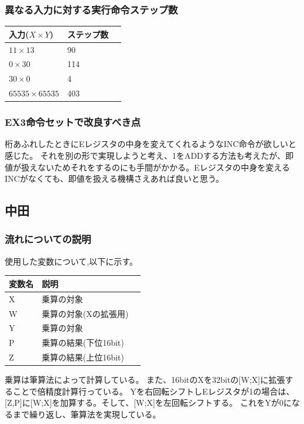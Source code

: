 \documentclass[dvipdfmx,12pt]{jreport}
\begin{document}
\subsubsection{異なる入力に対する実行命令ステップ数}
\begin{table}[h]
  \begin{tabular}{|l|l|l|} \hline
    入力($X \times Y$) & ステップ数 \\ \hline
    $11 \times 13$ & 90 \\ \hline
    $0 \times 30$ & 114 \\ \hline
    $30 \times 0$ & 4 \\ \hline
    $65535 \times 65535$ & 403 \\ \hline
  \end{tabular}
\end{table}

\subsubsection{EX3命令セットで改良すべき点}
桁あふれしたときにEレジスタの中身を変えてくれるようなINC命令が欲しいと感じた。
それを別の形で実現しようと考え、1をADDする方法も考えたが、即値が扱えないためそれをするのにも手間がかかる。Eレジスタの中身を変えるINCがなくても、即値を扱える機構さえあれば良いと思う。

\subsection*{中田}
\subsubsection*{流れについての説明}
使用した変数について,以下に示す。
\begin{table}[h]
  \begin{tabular}{|l|l|l|} \hline
    変数名 & 説明 \\ \hline
    X & 乗算の対象 \\ \hline
    W & 乗算の対象(Xの拡張用) \\ \hline
    Y& 乗算の対象 \\ \hline
    P & 乗算の結果(下位16bit) \\ \hline
    Z & 乗算の結果(上位16bit) \\ \hline
  \end{tabular}
\end{table}

乗算は筆算法によって計算している。
また、16bitのXを32bitの[W;X]に拡張することで倍精度計算行っている。
Yを右回転シフトしEレジスタが1の場合は、[Z,P]に[W;X]を加算する。そして、[W;X]を左回転シフトする。
これをYが0になるまで繰り返し、筆算法を実現している。　\\
\end{document}
